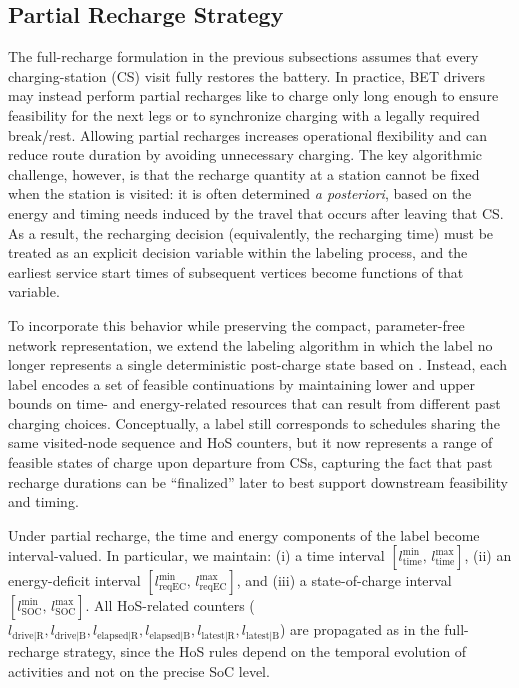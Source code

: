\documentclass[trsc,dblanonrev]{informs4}
\begin{document}
\subsection{Partial Recharge Strategy}\label{sec:PartialRechargeStrategy}

The full-recharge formulation in the previous subsections assumes that every charging-station (CS) visit fully restores the battery. In practice, BET drivers may instead perform partial recharges like to charge only long enough to ensure feasibility for the next legs or to synchronize charging with a legally required break/rest. Allowing partial recharges increases operational flexibility and can reduce route duration by avoiding unnecessary charging. The key algorithmic challenge, however, is that the recharge quantity at a station cannot be fixed when the station is visited: it is often determined \emph{a posteriori}, based on the energy and timing needs induced by the travel that occurs after leaving that CS. As a result, the recharging decision (equivalently, the recharging time) must be treated as an explicit decision variable within the labeling process, and the earliest service start times of subsequent vertices become functions of that variable.

To incorporate this behavior while preserving the compact, parameter-free network representation, we extend the labeling algorithm in which the label no longer represents a single deterministic post-charge state based on \cite{desaulniers2016exact}. Instead, each label encodes a set of feasible continuations by maintaining lower and upper bounds on time- and energy-related resources that can result from different past charging choices. Conceptually, a label still corresponds to schedules sharing the same visited-node sequence and HoS counters, but it now represents a range of feasible states of charge upon departure from CSs, capturing the fact that past recharge durations can be “finalized” later to best support downstream feasibility and timing.

Under partial recharge, the time and energy components of the label become interval-valued. In particular, we maintain:
(i) a time interval \([l_{\text{time}}^{\min},\, l_{\text{time}}^{\max}]\),
(ii) an energy-deficit interval \([l_{\text{reqEC}}^{\min},\, l_{\text{reqEC}}^{\max}]\), and
(iii) a state-of-charge interval \([l_{\text{SOC}}^{\min},\, l_{\text{SOC}}^{\max}]\).
All HoS-related counters (\(l_{\text{drive|R}}, l_{\text{drive|B}}, l_{\text{elapsed|R}}, l_{\text{elapsed|B}}, l_{\text{latest|R}}, l_{\text{latest|B}}\)) are propagated as in the full-recharge strategy, since the HoS rules depend on the temporal evolution of activities and not on the precise SoC level.
\end{document}
